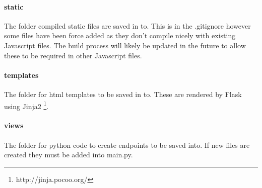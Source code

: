 \paragraph{static}  The folder compiled static files are saved in to.  This is in the .gitignore however some files have been force added as they don't compile nicely with existing Javascript files.  The build process will likely be updated in the future to allow these to be required in other Javascript files.

\paragraph{templates}  The folder for html templates to be saved in to.  These are rendered by Flask using Jinja2 \footnote{http://jinja.pocoo.org/}.

\paragraph{views}  The folder for python code to create endpoints to be saved into.  If new files are created they must be added into main.py.
